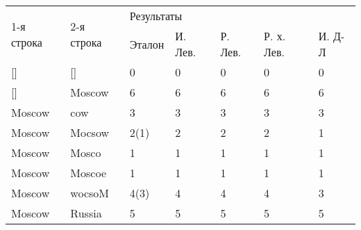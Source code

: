 \documentclass[a4paper,14pt, unknownkeysallowed]{extreport}
\begin{document}
\begin{table}[h]
\begin{center}
\begin{threeparttable}
\begin{tabular}{|l|l|lllll|}
\hline
\multirow{2}{*}{1-я строка} & \multirow{2}{*}{2-я строка} & \multicolumn{5}{l|}{Результаты}                                                                                                       \\ \cline{3-7} 
                            &                             & \multicolumn{1}{l|}{Эталон} & \multicolumn{1}{l|}{И. Лев.} & \multicolumn{1}{l|}{Р. Лев.} & \multicolumn{1}{l|}{Р. х. Лев.} & И. Д-Л \\ \hline
{[}{]}                      & {[}{]}                      & \multicolumn{1}{l|}{0}      & \multicolumn{1}{l|}{0}       & \multicolumn{1}{l|}{0}       & \multicolumn{1}{l|}{0}            & 0     \\ \hline
{[}{]}                      & Moscow                      & \multicolumn{1}{l|}{6}      & \multicolumn{1}{l|}{6}       & \multicolumn{1}{l|}{6}       & \multicolumn{1}{l|}{6}            & 6     \\ \hline
Moscow                      & cow                         & \multicolumn{1}{l|}{3}      & \multicolumn{1}{l|}{3}       & \multicolumn{1}{l|}{3}       & \multicolumn{1}{l|}{3}            & 3     \\ \hline
Moscow                      & Mocsow                      & \multicolumn{1}{l|}{2(1)}   & \multicolumn{1}{l|}{2}       & \multicolumn{1}{l|}{2}       & \multicolumn{1}{l|}{2}            & 1     \\ \hline
Moscow                      & Mosco                       & \multicolumn{1}{l|}{1}      & \multicolumn{1}{l|}{1}       & \multicolumn{1}{l|}{1}       & \multicolumn{1}{l|}{1}            & 1     \\ \hline
Moscow                      & Moscoe                      & \multicolumn{1}{l|}{1}      & \multicolumn{1}{l|}{1}       & \multicolumn{1}{l|}{1}       & \multicolumn{1}{l|}{1}            & 1     \\ \hline
Moscow                      & wocsoM                      & \multicolumn{1}{l|}{4(3)}   & \multicolumn{1}{l|}{4}       & \multicolumn{1}{l|}{4}       & \multicolumn{1}{l|}{4}            & 3     \\ \hline
Moscow                      & Russia                      & \multicolumn{1}{l|}{5}      & \multicolumn{1}{l|}{5}       & \multicolumn{1}{l|}{5}       & \multicolumn{1}{l|}{5}            & 5     \\ \hline
\end{tabular}
\end{threeparttable}
\end{center}
\end{table}
\end{document}

